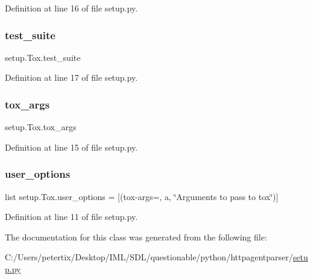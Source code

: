 Definition at line 16 of file setup.\+py.

\hypertarget{classsetup_1_1_tox_a32ec135eb310f1163a08216990c10564}{}\label{classsetup_1_1_tox_a32ec135eb310f1163a08216990c10564} 
\subsubsection{\texorpdfstring{test\+\_\+suite}{test\_suite}}
{\footnotesize\ttfamily setup.\+Tox.\+test\+\_\+suite}



Definition at line 17 of file setup.\+py.

\hypertarget{classsetup_1_1_tox_ac08f63adccecb66e89573fd7d30dcd33}{}\label{classsetup_1_1_tox_ac08f63adccecb66e89573fd7d30dcd33} 
\subsubsection{\texorpdfstring{tox\+\_\+args}{tox\_args}}
{\footnotesize\ttfamily setup.\+Tox.\+tox\+\_\+args}



Definition at line 15 of file setup.\+py.

\hypertarget{classsetup_1_1_tox_a3fd5640153f8f13c889183193d742ae0}{}\label{classsetup_1_1_tox_a3fd5640153f8f13c889183193d742ae0} 
\subsubsection{\texorpdfstring{user\+\_\+options}{user\_options}}
{\footnotesize\ttfamily list setup.\+Tox.\+user\+\_\+options = \mbox{[}(\textquotesingle{}tox-\/args=\textquotesingle{}, \textquotesingle{}a\textquotesingle{}, \char`\"{}Arguments to pass to tox\char`\"{})\mbox{]}\hspace{0.3cm}{\ttfamily [static]}}



Definition at line 11 of file setup.\+py.



The documentation for this class was generated from the following file\+:\begin{DoxyCompactItemize}
\item 
C\+:/\+Users/petertix/\+Desktop/\+I\+M\+L/\+S\+D\+L/questionable/python/httpagentparser/\hyperlink{setup_8py}{setup.\+py}\end{DoxyCompactItemize}
